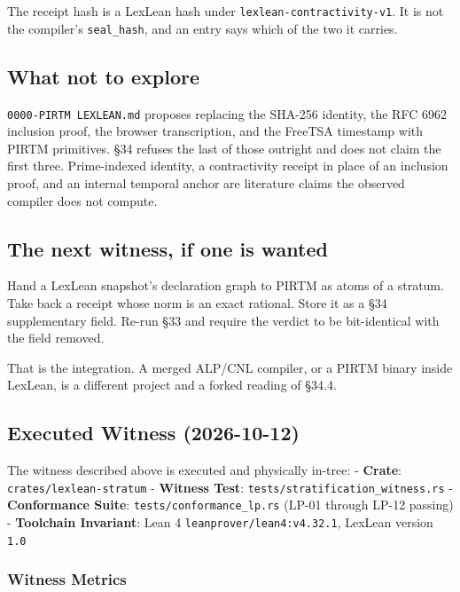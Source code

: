 \documentclass[
]{article}
\begin{document}
The receipt hash is a LexLean hash under
\texttt{lexlean-contractivity-v1}. It is not the compiler's
\texttt{seal\_hash}, and an entry says which of the two it carries.

\hypertarget{what-not-to-explore}{%
\subsection{What not to explore}\label{what-not-to-explore}}

\texttt{0000-PIRTM\ LEXLEAN.md} proposes replacing the SHA-256 identity,
the RFC 6962 inclusion proof, the browser transcription, and the FreeTSA
timestamp with PIRTM primitives. §34 refuses the last of those outright
and does not claim the first three. Prime-indexed identity, a
contractivity receipt in place of an inclusion proof, and an internal
temporal anchor are literature claims the observed compiler does not
compute.

\hypertarget{the-next-witness-if-one-is-wanted}{%
\subsection{The next witness, if one is
wanted}\label{the-next-witness-if-one-is-wanted}}

Hand a LexLean snapshot's declaration graph to PIRTM as atoms of a
stratum. Take back a receipt whose norm is an exact rational. Store it
as a §34 supplementary field. Re-run §33 and require the verdict to be
bit-identical with the field removed.

That is the integration. A merged ALP/CNL compiler, or a PIRTM binary
inside LexLean, is a different project and a forked reading of §34.4.

\hypertarget{executed-witness-2026-10-12}{%
\subsection{Executed Witness
(2026-10-12)}\label{executed-witness-2026-10-12}}

The witness described above is executed and physically in-tree: -
\textbf{Crate}: \texttt{crates/lexlean-stratum} - \textbf{Witness Test}:
\texttt{tests/stratification\_witness.rs} - \textbf{Conformance Suite}:
\texttt{tests/conformance\_lp.rs} (LP-01 through LP-12 passing) -
\textbf{Toolchain Invariant}: Lean 4 \texttt{leanprover/lean4:v4.32.1},
LexLean version \texttt{1.0}

\hypertarget{witness-metrics}{%
\subsubsection{Witness Metrics}\label{witness-metrics}}
\end{document}
